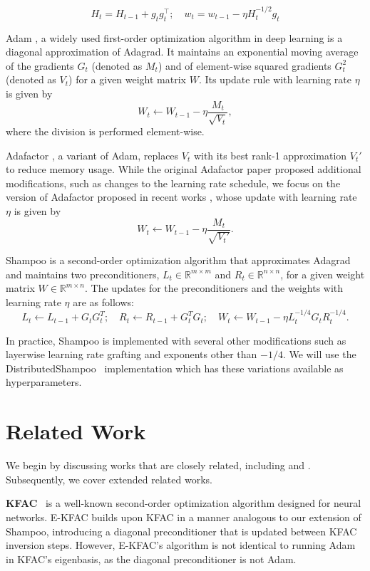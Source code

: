 \documentclass{article} %
\begin{document}
\[ H_t = H_{t-1} + g_t g_t^\top; \quad w_t = w_{t-1} - \eta H_t^{-1/2} g_t \]

Adam \citep{adam}, a widely used first-order optimization algorithm in 
deep learning is a diagonal approximation of Adagrad. It maintains an exponential moving average of the gradients 
$G_t$ (denoted as $M_t$) and of element-wise squared gradients $G_t^2$ 
(denoted as $V_t$) for a given weight matrix $W$. Its update rule with 
learning rate $\eta$ is given by
\[
W_t \leftarrow W_{t-1} - \eta \frac{M_t}{\sqrt{V_t}},
\]
where the division is performed element-wise.

Adafactor \citep{adafactor, zhai}, a variant of Adam, replaces $V_t$ with 
its best rank-1 approximation $V_t'$ to reduce memory usage. While the 
original Adafactor paper \citep{adafactor} proposed additional modifications, 
such as changes to the learning rate schedule, we focus on the version of 
Adafactor proposed in recent works \citep{zhai, zhaoscience}, whose update 
with learning rate $\eta$ is given by
\[
W_t \leftarrow W_{t-1} - \eta \frac{M_t}{\sqrt{V_t'}}.
\]

Shampoo \citep{shampoo} is a second-order optimization algorithm that approximates Adagrad and maintains two preconditioners, $L_t \in \mathbb{R}^{m \times m}$ and $R_t \in \mathbb{R}^{n \times n}$, for a given weight matrix $W \in 
\mathbb{R}^{m \times n}$. The updates for the preconditioners and the 
weights with learning rate $\eta$ are as follows:
\[
L_t \leftarrow L_{t-1} + G_tG_t^T; \quad R_t \leftarrow R_{t-1} + G_t^TG_t; 
\quad W_t \leftarrow W_{t-1} - \eta L_t^{-1/4} G_t R_t^{-1/4}.
\]

In practice, Shampoo is implemented with several other modifications such as layerwise learning rate grafting and exponents other than $-1/4$. We will use the DistributedShampoo~\citep{distributedshampoo} implementation which has these variations available as hyperparameters.




\section{Related Work}
\label{sec:related}
We begin by discussing works that are closely related, including \citet{ekfac, 
	anil2020scalable} and \citet{galore}. Subsequently, we  cover extended related works.

\textbf{KFAC}~\citep{martens15} is a well-known second-order optimization algorithm designed 
for neural networks. E-KFAC \citep{ekfac} builds upon KFAC in a manner analogous to 
our extension of Shampoo, introducing a diagonal preconditioner that is updated 
between KFAC inversion steps. However, E-KFAC's algorithm is not identical to running 
Adam in KFAC’s eigenbasis, as the diagonal preconditioner is not Adam.
\end{document}
